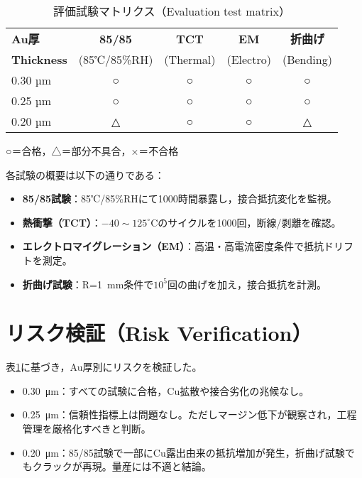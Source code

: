 \documentclass[conference]{IEEEtran}
\begin{document}
\begin{table}[htbp]
  \centering
  \caption{評価試験マトリクス（Evaluation test matrix）}
  \label{tab:test-matrix}
  \begin{tabular}{@{}lcccc@{}}
    \toprule
    \textbf{Au厚} & \textbf{85/85} & \textbf{TCT} & \textbf{EM} & \textbf{折曲げ} \\
    \textbf{Thickness} & (85℃/85\%RH) & (Thermal) & (Electro) & (Bending) \\
    \midrule
    0.30 µm & ○ & ○ & ○ & ○ \\
    0.25 µm & ○ & ○ & ○ & ○ \\
    0.20 µm & △ & ○ & ○ & △ \\
    \bottomrule
  \end{tabular}
  \vspace{2pt}
  \footnotesize{○＝合格，△＝部分不具合，×＝不合格}
\end{table}

各試験の概要は以下の通りである：
\begin{itemize}
  \item \textbf{85/85試験}：85℃/85\%RHにて1000時間暴露し，接合抵抗変化を監視。
  \item \textbf{熱衝撃（TCT）}：$-40\sim125^\circ$Cのサイクルを1000回，断線/剥離を確認。
  \item \textbf{エレクトロマイグレーション（EM）}：高温・高電流密度条件で抵抗ドリフトを測定。
  \item \textbf{折曲げ試験}：R=\SI{1}{mm}条件で$10^5$回の曲げを加え，接合抵抗を計測。
\end{itemize}

\section{リスク検証（Risk Verification）}
表\ref{tab:test-matrix}に基づき，Au厚別にリスクを検証した。
\begin{itemize}
  \item \SI{0.30}{\micro\meter}：すべての試験に合格，Cu拡散や接合劣化の兆候なし。
  \item \SI{0.25}{\micro\meter}：信頼性指標上は問題なし。ただしマージン低下が観察され，工程管理を厳格化すべきと判断。
  \item \SI{0.20}{\micro\meter}：85/85試験で一部にCu露出由来の抵抗増加が発生，折曲げ試験でもクラックが再現。量産には不適と結論。
\end{itemize}
\end{document}
